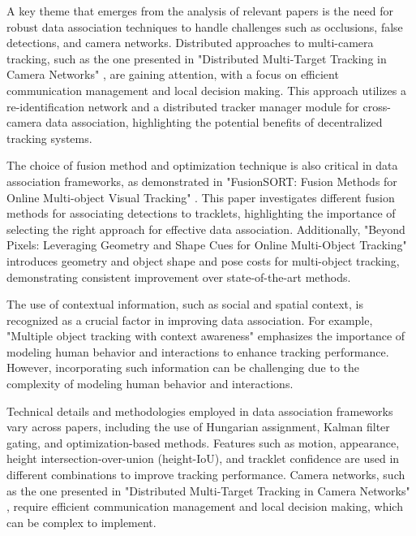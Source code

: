 \documentclass[conference]{IEEEtran}
\begin{document}
A key theme that emerges from the analysis of relevant papers is the need for robust data association techniques to handle challenges such as occlusions, false detections, and camera networks. Distributed approaches to multi-camera tracking, such as the one presented in "Distributed Multi-Target Tracking in Camera Networks" \cite{Distributed Multi-Target Tracking in Camera Networks}, are gaining attention, with a focus on efficient communication management and local decision making. This approach utilizes a re-identification network and a distributed tracker manager module for cross-camera data association, highlighting the potential benefits of decentralized tracking systems.

The choice of fusion method and optimization technique is also critical in data association frameworks, as demonstrated in "FusionSORT: Fusion Methods for Online Multi-object Visual Tracking" \cite{FusionSORT: Fusion Methods for Online Multi-object Visual Tracking}. This paper investigates different fusion methods for associating detections to tracklets, highlighting the importance of selecting the right approach for effective data association. Additionally, "Beyond Pixels: Leveraging Geometry and Shape Cues for Online Multi-Object Tracking" \cite{Beyond Pixels: Leveraging Geometry and Shape Cues for Online Multi-Object Tracking} introduces geometry and object shape and pose costs for multi-object tracking, demonstrating consistent improvement over state-of-the-art methods.

The use of contextual information, such as social and spatial context, is recognized as a crucial factor in improving data association. For example, "Multiple object tracking with context awareness" \cite{Multiple object tracking with context awareness} emphasizes the importance of modeling human behavior and interactions to enhance tracking performance. However, incorporating such information can be challenging due to the complexity of modeling human behavior and interactions.

Technical details and methodologies employed in data association frameworks vary across papers, including the use of Hungarian assignment, Kalman filter gating, and optimization-based methods. Features such as motion, appearance, height intersection-over-union (height-IoU), and tracklet confidence are used in different combinations to improve tracking performance. Camera networks, such as the one presented in "Distributed Multi-Target Tracking in Camera Networks" \cite{Distributed Multi-Target Tracking in Camera Networks}, require efficient communication management and local decision making, which can be complex to implement.
\end{document}
